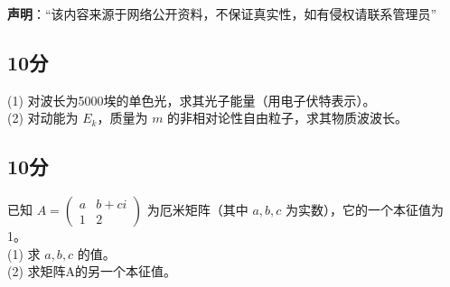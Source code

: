 
\textbf{声明}：“该内容来源于网络公开资料，不保证真实性，如有侵权请联系管理员”

\subsection{10分}
(1) 对波长为5000埃的单色光，求其光子能量（用电子伏特表示）。\\
(2) 对动能为 $E_k$，质量为 $m$ 的非相对论性自由粒子，求其物质波波长。
\subsection{10分}
已知 $A = \begin{pmatrix} a & b+ci \\ 1 & 2 \end{pmatrix}$ 为厄米矩阵（其中 $a, b, c$ 为实数），它的一个本征值为1。\\
(1) 求 $a, b, c$ 的值。\\
(2) 求矩阵A的另一个本征值。
